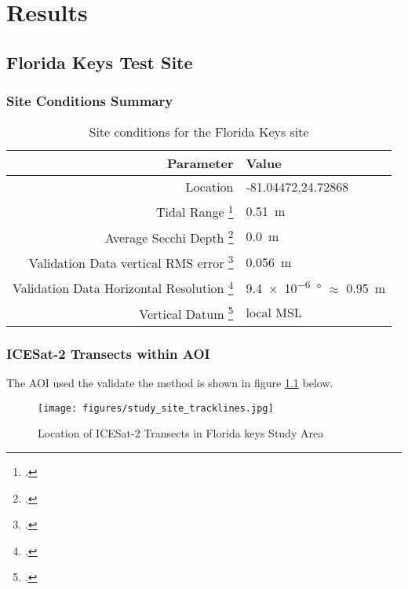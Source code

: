 \chapter{Results}

\section{Florida Keys Test Site}

\subsection{Site Conditions Summary}


\begin{table}[htbp]
    \begin{minipage}{0.5\textwidth}
        \centering\begin{tabular}{r l }
            Parameter                                                      & \textbf{Value}                                 \\
            \hline
            Location                                                       & -81.04472,24.72868                             \\
            Tidal Range \footcite{tidal_data_reanalysis2022}               & \qty{0.51}{m}                                  \\
            Average Secchi Depth \footcite{ACRI-STGlobColourTeam2020}      & \qty{0.0}{m}                                   \\
            Validation Data vertical RMS error \footcite{Keys2019Lidar}    & \qty{0.056}{m}                                 \\
            Validation Data Horizontal Resolution \footcite{Keys2019Lidar} & \qty{9.4e-6}{ \degree} $\approx$ \qty{0.95}{m} \\
            Vertical Datum \footcite{Keys2019Lidar}                        & local MSL                                      \\
        \end{tabular}
    \end{minipage}
    \caption{Site conditions for the Florida Keys site}
    \label{table:floridasitestats}
\end{table}


\subsection{ICESat-2 Transects within AOI}
The AOI used the validate the method is shown in figure \ref{fig:keys_transects} below.
\begin{figure}[h!]
    \centering
    \texttt{[image: figures/study\_site\_tracklines.jpg]}
    \caption{Location of ICESat-2 Transects in Florida keys Study Area}
    \label{fig:keys_transects}
\end{figure}
